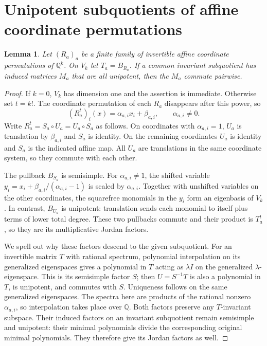 \documentclass[acmlarge,screen,11pt,nonacm]{acmart}
\newcommand{\Q}{\mathbb{Q}}
\newtheorem{lemma}[theorem]{Lemma}
\theoremstyle{definition}
\begin{document}
\section{Unipotent subquotients of affine coordinate permutations}\label{sec:jordan}
\begin{lemma}\label{lem:unipotent}
Let $(R_a)_a$ be a finite family of invertible affine coordinate permutations of $\Q^k$. On $V_k$ let $T_a=B_{R_a}$. If a common invariant subquotient has induced matrices $M_a$ that are all unipotent, then the $M_a$ commute pairwise.
\end{lemma}
\begin{proof}
If $k=0$, $V_k$ has dimension one and the assertion is immediate. Otherwise set $t=k!$. The coordinate permutation of each $R_a$ disappears after this power, so
\[
 (R_a^t)_i(x)=\alpha_{a,i}x_i+\beta_{a,i},\qquad \alpha_{a,i}\ne0.
\]
Write $R_a^t=S_a\circ U_a=U_a\circ S_a$ as follows. On coordinates with $\alpha_{a,i}=1$, $U_a$ is translation by $\beta_{a,i}$ and $S_a$ is identity. On the remaining coordinates $U_a$ is identity and $S_a$ is the indicated affine map. All $U_a$ are translations in the same coordinate system, so they commute with each other.

The pullback $B_{S_a}$ is semisimple. For $\alpha_{a,i}\ne1$, the shifted variable $y_i=x_i+\beta_{a,i}/(\alpha_{a,i}-1)$ is scaled by $\alpha_{a,i}$. Together with unshifted variables on the other coordinates, the squarefree monomials in the $y_i$ form an eigenbasis of $V_k$. In contrast, $B_{U_a}$ is unipotent: translation sends each monomial to itself plus terms of lower total degree. These two pullbacks commute and their product is $T_a^t$, so they are its multiplicative Jordan factors.

We spell out why these factors descend to the given subquotient. For an invertible matrix $T$ with rational spectrum, polynomial interpolation on its generalized eigenspaces gives a polynomial in $T$ acting as $\lambda I$ on the generalized $\lambda$-eigenspace. This is its semisimple factor $S$; then $U=S^{-1}T$ is also a polynomial in $T$, is unipotent, and commutes with $S$. Uniqueness follows on the same generalized eigenspaces. The spectra here are products of the rational nonzero $\alpha_{a,i}$, so interpolation takes place over $\Q$. Both factors preserve any $T$-invariant subspace. Their induced factors on an invariant subquotient remain semisimple and unipotent: their minimal polynomials divide the corresponding original minimal polynomials. They therefore give its Jordan factors as well.


\end{proof}
\end{document}
